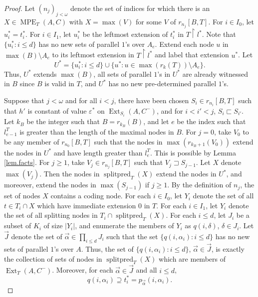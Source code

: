 \documentclass{amsart}
\theoremstyle{remark}
\theoremstyle{definition}
\theoremstyle{remark}
\newcommand{\al}{\alpha}
\newcommand{\om}{\omega}
\newcommand{\contains}{\supseteq}
\DeclareMathOperator{\Ext}{Ext}
\DeclareMathOperator{\splitpred}{splitpred}
\DeclareMathOperator{\MPE}{MPE}
\newcommand{\re}{\restriction}
\begin{document}
\begin{proof}
Let $(n_j)_{j<\om}$ denote the set of  indices for which  there is an
$X\in \MPE_T(A,C)$
with $X=\max(V)$ for some
$V$ of $r_{n_j}[B,T]$.
 For  $i\in I_0$,
let $u^*_i=t^*_i$.
For $i\in I_1$,
let $u_i^*$ be the  leftmost extension of $t^*_i$ in $T\re l^*$.
Note that $\{u_i^*:i\le d\}$ has no new sets of parallel $1$'s over $A_e$.
Extend each node $u$ in $\max(B)\setminus A_e$   to its  leftmost extension in $T\re l^*$ and label that extension $u^*$.
Let
\begin{equation}
U^*=\{u^*_i:i\le d\}\cup\{u^*:u\in \max(r_k(T))\setminus A_e\}.
\end{equation}
Thus, $U^*$ extends $\max(B)$,
all sets of parallel $1$'s in $U^*$ are already witnessed in $B$ since $B$ is valid in $T$,
and $U^*$ has no new pre-determined parallel $1$'s.


Suppose that $j<\om$ and for all $i<j$, there have been chosen $S_i\in r_{n_i}[B,T]$ such that
$h'$ is constant of value $\varepsilon^*$ on $\Ext_{S_{i}}(A,C^-)$,
and
 for $i<i'<j$,
$S_i\sqsubset S_{i'}$.
Let $k_B$ be the integer such that $B=r_{k_B}(B)$, and
let $e$ be the index such that
$l^T_{e-1}$ is greater than the length of the maximal nodes in $B$.
For $j=0$,
take
  $V_0$ to be any member of $r_{n_0}[B,T]$
such that
the nodes in $\max(r_{k_B+1}(V_0))$ extend the nodes in $U^*$
and have length greater than $l^T_e$.
This is possible by Lemma \ref{lem.facts}.
For $j\ge 1$,
take $V_j\in r_{n_j}[B,T]$
such that $V_j\sqsupset S_{j-1}$.
Let $X$ denote $\max(V_j)$.
Then the
nodes in $\splitpred_T(X)$
extend the nodes in $U^*$, and moreover,
extend the nodes in $\max(S_{j-1})$ if $j\ge 1$.
By the definition of $n_j$, the set of nodes $X$ contains a coding node.
For each $i\in I_0$,
let $Y_i$ denote the set of all $t\in T_i\cap X$
which have immediate extension $0$ in $T$.
For each $i\in I_1$,
let $Y_i$ denote the set of all
splitting nodes in
$T_i\cap \splitpred_T(X)$.
For each $i\le d$,
let $J_i$ be a subset of $K_i$ of size $|Y_i|$,
and enumerate the members of $Y_i$ as $q(i,\delta)$, $\delta\in J_i$.
Let $\vec{J}$ denote the set of $\vec\al\in\prod_{i\le d}J_i$ such that the set $\{q(i,\al_i):i\le d\}$
has no new sets of parallel $1$'s over $A$.
Thus, the set of $\{q(i,\al_i):i\le d\}$, $\vec\al\in \vec{J}$, is exactly the collection of sets of nodes in $\splitpred_T(X)$ which are members of
 $\Ext_{T}(A,C^-)$.
Moreover, for each
$\vec\al\in \vec{J}$
and  all $i\le d$,
\begin{equation}
q(i,\al_i)\contains t^*_i=p_{\vec{\al}}(i,\al_i).
\end{equation}




\end{proof}
\end{document}
